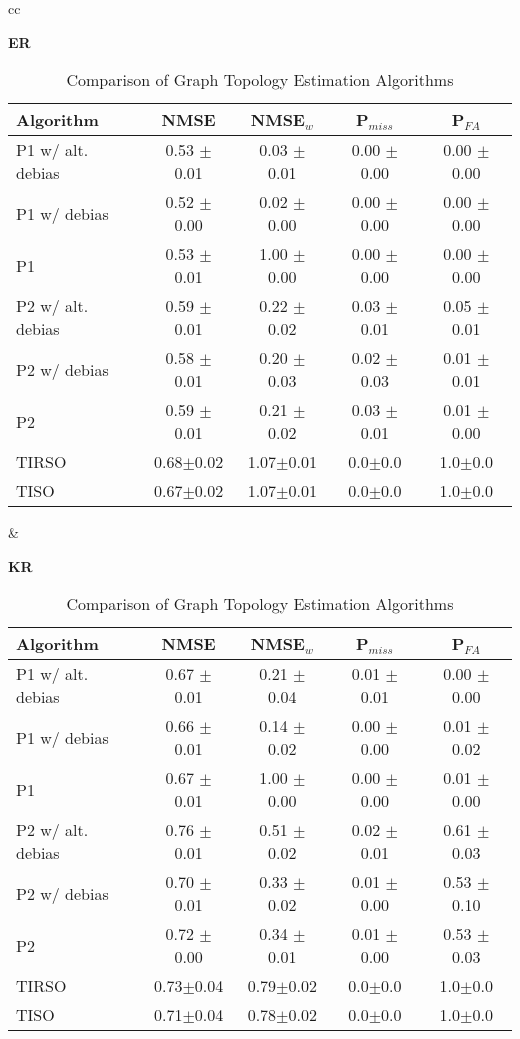 \begin{table}[htbp]
\centering
\caption{Comparison of Graph Topology Estimation Algorithms}
\label{tab:graph_estimation}
\setlength{\tabcolsep}{3pt}
\small

\begin{tabular}{cc}


\begin{minipage}{0.48\textwidth}
\centering
\textbf{ER}
\begin{tabular}{lcccc}
\toprule
Algorithm & NMSE & NMSE$_w$ & P$_{miss}$ & P$_{FA}$ \\
\midrule
P1 w/ alt. debias & 0.53 $\pm$ 0.01 & 0.03 $\pm$ 0.01 & 0.00 $\pm$ 0.00 & 0.00 $\pm$ 0.00 \\
P1 w/ debias & 0.52 $\pm$ 0.00 & 0.02 $\pm$ 0.00 & 0.00 $\pm$ 0.00 & 0.00 $\pm$ 0.00 \\
P1 & 0.53 $\pm$ 0.01 & 1.00 $\pm$ 0.00 & 0.00 $\pm$ 0.00 & 0.00 $\pm$ 0.00 \\
P2 w/ alt. debias & 0.59 $\pm$ 0.01 & 0.22 $\pm$ 0.02 & 0.03 $\pm$ 0.01 & 0.05 $\pm$ 0.01 \\
P2 w/ debias & 0.58 $\pm$ 0.01 & 0.20 $\pm$ 0.03 & 0.02 $\pm$ 0.03 & 0.01 $\pm$ 0.01 \\
P2 & 0.59 $\pm$ 0.01 & 0.21 $\pm$ 0.02 & 0.03 $\pm$ 0.01 & 0.01 $\pm$ 0.00 \\
TIRSO & 0.68{\tiny$\pm$0.02} & 1.07{\tiny$\pm$0.01} & 0.0{\tiny$\pm$0.0} & 1.0{\tiny$\pm$0.0} \\
TISO & 0.67{\tiny$\pm$0.02} & 1.07{\tiny$\pm$0.01} & 0.0{\tiny$\pm$0.0} & 1.0{\tiny$\pm$0.0} \\
\bottomrule
\end{tabular}
\end{minipage}
&
\begin{minipage}{0.48\textwidth}
\centering
\textbf{KR}
\begin{tabular}{lcccc}
\toprule
Algorithm & NMSE & NMSE$_w$ & P$_{miss}$ & P$_{FA}$ \\
\midrule
P1 w/ alt. debias & 0.67 $\pm$ 0.01 & 0.21 $\pm$ 0.04 & 0.01 $\pm$ 0.01 & 0.00 $\pm$ 0.00 \\
P1 w/ debias & 0.66 $\pm$ 0.01 & 0.14 $\pm$ 0.02 & 0.00 $\pm$ 0.00 & 0.01 $\pm$ 0.02 \\
P1 & 0.67 $\pm$ 0.01 & 1.00 $\pm$ 0.00 & 0.00 $\pm$ 0.00 & 0.01 $\pm$ 0.00 \\
P2 w/ alt. debias & 0.76 $\pm$ 0.01 & 0.51 $\pm$ 0.02 & 0.02 $\pm$ 0.01 & 0.61 $\pm$ 0.03 \\
P2 w/ debias & 0.70 $\pm$ 0.01 & 0.33 $\pm$ 0.02 & 0.01 $\pm$ 0.00 & 0.53 $\pm$ 0.10 \\
P2 & 0.72 $\pm$ 0.00 & 0.34 $\pm$ 0.01 & 0.01 $\pm$ 0.00 & 0.53 $\pm$ 0.03 \\
TIRSO & 0.73{\tiny$\pm$0.04} & 0.79{\tiny$\pm$0.02} & 0.0{\tiny$\pm$0.0} & 1.0{\tiny$\pm$0.0} \\
TISO & 0.71{\tiny$\pm$0.04} & 0.78{\tiny$\pm$0.02} & 0.0{\tiny$\pm$0.0} & 1.0{\tiny$\pm$0.0} \\
\bottomrule
\end{tabular}
\end{minipage} \\
\vspace{1em}



\end{tabular}
\end{table}
